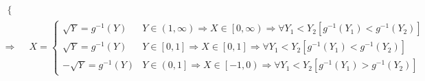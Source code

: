 \documentclass[
]{book}
\theoremstyle{definition}
\theoremstyle{definition}
\theoremstyle{definition}
\theoremstyle{definition}
\theoremstyle{remark}
\begin{document}
\[\begin{aligned}
\begin{cases}
\end{cases}\\
\Rightarrow & X=\begin{cases}
\sqrt{Y}=g^{-1}\left(Y\right) & Y\in\left(1,\infty\right)\Rightarrow X\in\left[0,\infty\right)\Rightarrow\forall Y_{{\scriptscriptstyle 1}}<Y_{{\scriptscriptstyle 2}}\left[g^{-1}\left(Y_{{\scriptscriptstyle 1}}\right)<g^{-1}\left(Y_{{\scriptscriptstyle 2}}\right)\right]\\
\sqrt{Y}=g^{-1}\left(Y\right) & Y\in\left[0,1\right]\Rightarrow X\in\left[0,1\right]\Rightarrow\forall Y_{{\scriptscriptstyle 1}}<Y_{{\scriptscriptstyle 2}}\left[g^{-1}\left(Y_{{\scriptscriptstyle 1}}\right)<g^{-1}\left(Y_{{\scriptscriptstyle 2}}\right)\right]\\
-\sqrt{Y}=g^{-1}\left(Y\right) & Y\in\left(0,1\right]\Rightarrow X\in\left[-1,0\right)\Rightarrow\forall Y_{{\scriptscriptstyle 1}}<Y_{{\scriptscriptstyle 2}}\left[g^{-1}\left(Y_{{\scriptscriptstyle 1}}\right)>g^{-1}\left(Y_{{\scriptscriptstyle 2}}\right)\right]
\end{cases}
\end{aligned}
\]
\end{document}
